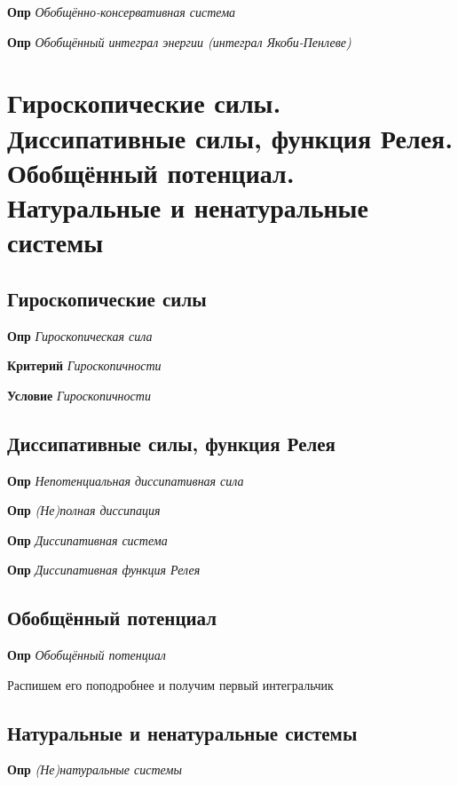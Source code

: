 \documentclass[a4paper, 14pt]{article}
\begin{document}
    \textbf{Опр} \textit{Обобщённо-консервативная система}
    
    \textbf{Опр} \textit{Обобщённый интеграл энергии (интеграл Якоби-Пенлеве)}
    
    \section{Гироскопические силы.
    Диссипативные силы, функция Релея.
    Обобщённый потенциал.
    Натуральные и ненатуральные системы}
    
    \subsection{Гироскопические силы}
    
    \textbf{Опр} \textit{Гироскопическая сила}
    
    \textbf{Критерий} \textit{Гироскопичности}
    
    \textbf{Условие} \textit{Гироскопичности}
    
    \subsection{Диссипативные силы, функция Релея}
    
    \textbf{Опр} \textit{Непотенциальная диссипативная сила}
    
    \textbf{Опр} \textit{(Не)полная диссипация}
    
    \textbf{Опр} \textit{Диссипативная система}
    
    \textbf{Опр} \textit{Диссипативная функция Релея}
    
    \subsection{Обобщённый потенциал}
    
    \textbf{Опр} \textit{Обобщённый потенциал}
    
    Распишем его поподробнее и получим первый интегральчик
    
    \subsection{Натуральные и ненатуральные системы}
    
    \textbf{Опр} \textit{(Не)натуральные системы}
    
\end{document}
